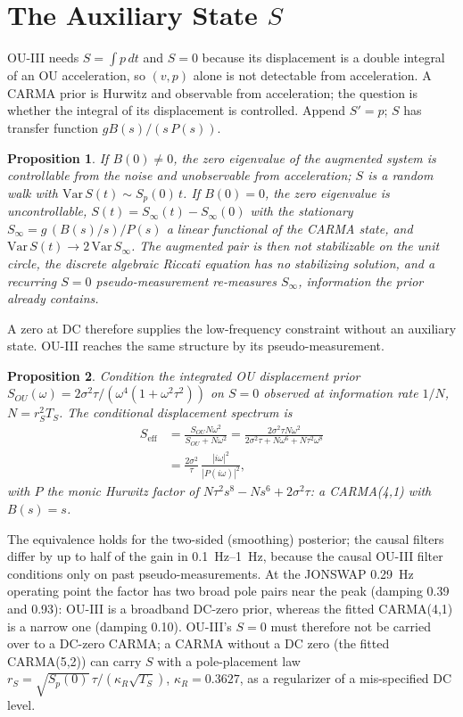\documentclass[conference]{IEEEtran}
\theoremstyle{bodysmall}
\newtheorem{proposition}{Proposition}
\begin{document}
\section{The Auxiliary State $S$}
\label{sec:s}
OU-III needs $S=\int p\,dt$ and $S=0$ because its displacement is a double
integral of an OU acceleration, so $(v,p)$ alone is not detectable from
acceleration. A CARMA prior is Hurwitz and observable from acceleration; the
question is whether the integral of its displacement is controlled. Append
$S'=p$; $S$ has transfer function $gB(s)/(s\,P(s))$.

\begin{proposition}
If $B(0)\neq0$, the zero eigenvalue of the augmented system is controllable
from the noise and unobservable from acceleration; $S$ is a random walk with
$\mathrm{Var}\,S(t)\sim S_p(0)\,t$. If $B(0)=0$, the zero eigenvalue is
uncontrollable, $S(t)=S_\infty(t)-S_\infty(0)$ with the stationary
$S_\infty=g\,(B(s)/s)/P(s)$ a linear functional of the CARMA state, and
$\mathrm{Var}\,S(t)\to2\,\mathrm{Var}\,S_\infty$. The augmented pair is then
not stabilizable on the unit circle, the discrete algebraic Riccati equation
has no stabilizing solution, and a recurring $S=0$ pseudo-measurement
re-measures $S_\infty$, information the prior already contains.
\end{proposition}

A zero at DC therefore supplies the low-frequency constraint without an
auxiliary state. OU-III reaches the same structure by its pseudo-measurement.

\begin{proposition}
Condition the integrated OU displacement prior
$S_{OU}(\omega)=2\sigma^2\tau/(\omega^4(1+\omega^2\tau^2))$ on $S=0$
observed at information rate $1/N$, $N=r_S^2T_S$. The conditional
displacement spectrum is
\begin{align}
S_{\mathrm{eff}}&=\frac{S_{OU}N\omega^2}{S_{OU}+N\omega^2}
=\frac{2\sigma^2\tau N\omega^2}{2\sigma^2\tau+N\omega^6+N\tau^2\omega^8}
\nonumber\\
&=\frac{2\sigma^2}{\tau}\,\frac{|i\omega|^2}{|P(i\omega)|^2},
\label{eq:ou3-dc-zero}
\end{align}
with $P$ the monic Hurwitz factor of $N\tau^2s^8-Ns^6+2\sigma^2\tau$: a
CARMA(4,1) with $B(s)=s$.
\end{proposition}

The equivalence holds for the two-sided (smoothing) posterior; the causal
filters differ by up to half of the gain in \SIrange{0.1}{1}{Hz}, because
the causal OU-III filter conditions only on past pseudo-measurements. At the
JONSWAP \SI{0.29}{Hz} operating point the factor has two broad pole pairs
near the peak (damping 0.39 and 0.93): OU-III is a broadband DC-zero prior,
whereas the fitted CARMA(4,1) is a narrow one (damping 0.10). OU-III's $S=0$
must therefore not be carried over to a DC-zero CARMA; a CARMA without a DC
zero (the fitted CARMA(5,2)) can carry $S$ with a pole-placement law
$r_S=\sqrt{S_p(0)}\,\tau/(\kappa_R\sqrt{T_S})$, $\kappa_R=0.3627$, as a
regularizer of a mis-specified DC level.
\end{document}
